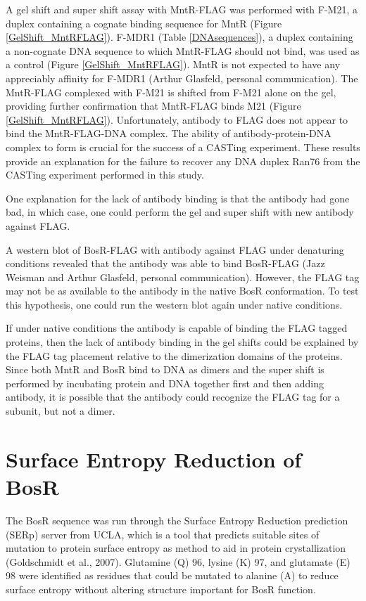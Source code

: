 \documentclass[12pt,twoside]{reedthesis}
\begin{document}
A gel shift and super shift assay with MntR-FLAG was performed with F-M21, a duplex containing a cognate binding sequence for MntR (Figure \ref{GelShift_MntRFLAG}). F-MDR1 (Table \ref{DNAsequences}), a duplex containing a non-cognate DNA sequence to which MntR-FLAG should not bind, was used as a control (Figure \ref{GelShift_MntRFLAG}). MntR is not expected to have any appreciably affinity for F-MDR1 (Arthur Glasfeld, personal communication). The MntR-FLAG complexed with F-M21 is shifted from F-M21 alone on the gel, providing further confirmation that MntR-FLAG binds M21 (Figure \ref{GelShift_MntRFLAG}). Unfortunately, antibody to FLAG does not appear to bind the MntR-FLAG-DNA complex. The ability of antibody-protein-DNA complex to form is crucial for the success of a CASTing experiment. These results provide an explanation for the failure to recover any DNA duplex Ran76 from the CASTing experiment performed in this study. 

One explanation for the lack of antibody binding is that the antibody had gone bad, in which case, one could perform the gel and super shift with new antibody against FLAG. 

A western blot of BosR-FLAG with antibody against FLAG under denaturing conditions revealed that the antibody was able to bind BosR-FLAG (Jazz Weisman and Arthur Glasfeld, personal communication). However, the FLAG tag may not be as available to the antibody in the native BosR conformation. To test this hypothesis, one could run the western blot again under native conditions.

If under native conditions the antibody is capable of binding the FLAG tagged proteins, then the lack of antibody binding in the gel shifts could be explained by the FLAG tag placement relative to the dimerization domains of the proteins. Since both MntR and BosR bind to DNA as dimers and the super shift is performed by incubating protein and DNA together first and then adding antibody, it is possible that the antibody could recognize the FLAG tag for a subunit, but not a dimer. 
   
   	\section{Surface Entropy Reduction of BosR}
   	
   	   The BosR sequence was run through the Surface Entropy Reduction prediction (SERp) server from UCLA, which is a tool that predicts suitable sites of mutation to protein surface entropy as method to aid in protein crystallization (Goldschmidt et al., 2007). Glutamine (Q) 96, lysine (K) 97, and glutamate (E) 98 were identified as residues that could be mutated to alanine (A) to reduce surface entropy without altering structure important for BosR function.
   	    
\end{document}
